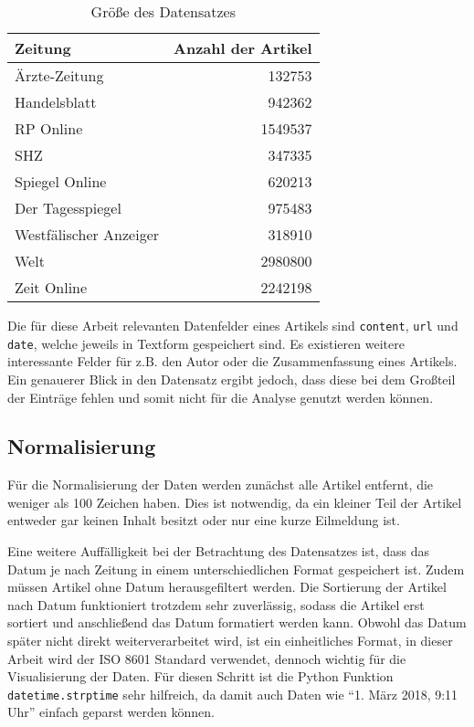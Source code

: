 \begin{table}[h]
\centering
\begin{spacing}{1.25}
\begin{tabular}[t]{lr}
\toprule
Zeitung & Anzahl der Artikel \\
\midrule
Ärzte-Zeitung & 132753 \\
Handelsblatt & 942362 \\
RP Online & 1549537 \\
SHZ & 347335 \\
Spiegel Online & 620213 \\
Der Tagesspiegel & 975483 \\
Westfälischer Anzeiger & 318910 \\
Welt & 2980800 \\
Zeit Online & 2242198 \\
\bottomrule
\end{tabular}
\caption{Größe des Datensatzes}
\label{table.data}
\end{spacing}
\end{table}

Die für diese Arbeit relevanten Datenfelder eines Artikels sind \texttt{content}, \texttt{url} und \texttt{date}, welche jeweils in Textform gespeichert sind. Es existieren weitere interessante Felder für z.B. den Autor oder die Zusammenfassung eines Artikels. Ein genauerer Blick in den Datensatz ergibt jedoch, dass diese bei dem Großteil der Einträge fehlen und somit nicht für die Analyse genutzt werden können.

\subsection{Normalisierung}
Für die Normalisierung der Daten werden zunächst alle Artikel entfernt, die weniger als 100 Zeichen haben. Dies ist notwendig, da ein kleiner Teil der Artikel entweder gar keinen Inhalt besitzt oder nur eine kurze Eilmeldung ist.

Eine weitere Auffälligkeit bei der Betrachtung des Datensatzes ist, dass das Datum je nach Zeitung in einem unterschiedlichen Format gespeichert ist. Zudem müssen Artikel ohne Datum herausgefiltert werden. Die Sortierung der Artikel nach Datum funktioniert trotzdem sehr zuverlässig, sodass die Artikel erst sortiert und anschließend das Datum formatiert werden kann. Obwohl das Datum später nicht direkt weiterverarbeitet wird, ist ein einheitliches Format, in dieser Arbeit wird der ISO 8601 Standard verwendet, dennoch wichtig für die Visualisierung der Daten. Für diesen Schritt ist die Python Funktion \texttt{datetime.strptime} sehr hilfreich, da damit auch Daten wie "`1. März 2018, 9:11 Uhr"' einfach geparst werden können.

